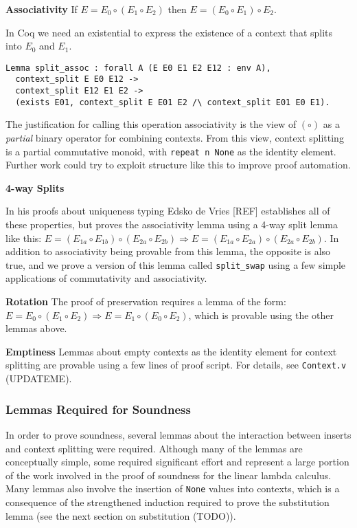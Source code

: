 \documentclass[]{unswthesis}
\let\c\texttt
\let\i\textit
\begin{document}
\textbf{Associativity} If $E = E_0 \circ (E_1 \circ E_2)$ then $E = (E_0 \circ E_1) \circ E_2$.

In Coq we need an existential to express the existence of a context that splits into $E_0$ and $E_1$.

\begin{verbatim}
Lemma split_assoc : forall A (E E0 E1 E2 E12 : env A),
  context_split E E0 E12 ->
  context_split E12 E1 E2 ->
  (exists E01, context_split E E01 E2 /\ context_split E01 E0 E1).
\end{verbatim}

The justification for calling this operation associativity is the view of $(\circ)$ as a \i{partial} binary operator for combining contexts. From this view, context splitting is a partial commutative monoid, with \c{repeat n None} as the identity element. Further work could try to exploit structure like this to improve proof automation.

\textbf{4-way Splits}

In his proofs about uniqueness typing Edsko de Vries [REF] establishes all of these properties, but proves the associativity lemma using a 4-way split lemma like this: $E = (E_{1a} \circ E_{1b}) \circ (E_{2a} \circ E_{2b}) \Rightarrow E = (E_{1a} \circ E_{2a}) \circ (E_{2a} \circ E_{2b})$. In addition to associativity being provable from this lemma, the opposite is also true, and we prove a version of this lemma called \c{split_swap} using a few simple applications of commutativity and associativity.

\textbf{Rotation} The proof of preservation requires a lemma of the form: $E = E_0 \circ (E_1 \circ E_2) \Rightarrow E = E_1 \circ (E_0 \circ E_2)$, which is provable using the other lemmas above.

\textbf{Emptiness} Lemmas about empty contexts as the identity element for context splitting are provable using a few lines of proof script. For details, see \c{Context.v} (UPDATEME).


\subsubsection{Lemmas Required for Soundness}

In order to prove soundness, several lemmas about the interaction between inserts and context splitting were required. Although many of the lemmas are conceptually simple, some required significant effort and represent a large portion of the work involved in the proof of soundness for the linear lambda calculus. Many lemmas also involve the insertion of \c{None} values into contexts, which is a consequence of the strengthened induction required to prove the substitution lemma (see the next section on substitution (TODO)).
\end{document}
